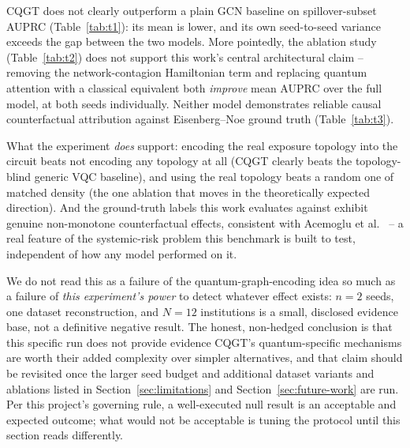 \documentclass[journal]{IEEEtran}
\begin{document}
CQGT does not clearly outperform a plain GCN baseline on spillover-subset
AUPRC (Table~\ref{tab:t1}): its mean is lower, and its own seed-to-seed
variance exceeds the gap between the two models. More pointedly, the
ablation study (Table~\ref{tab:t2}) does not support this work's central
architectural claim -- removing the network-contagion Hamiltonian term
and replacing quantum attention with a classical equivalent both
\emph{improve} mean AUPRC over the full model, at both seeds
individually. Neither model demonstrates reliable causal counterfactual
attribution against Eisenberg--Noe ground truth (Table~\ref{tab:t3}).

What the experiment \emph{does} support: encoding the real exposure
topology into the circuit beats not encoding any topology at all (CQGT
clearly beats the topology-blind generic VQC baseline), and using the
real topology beats a random one of matched density (the one ablation
that moves in the theoretically expected direction). And the ground-truth
labels this work evaluates against exhibit genuine non-monotone
counterfactual effects, consistent with Acemoglu et al.\
\cite{acemoglu2015} -- a real feature of the systemic-risk problem this
benchmark is built to test, independent of how any model performed on
it.

We do not read this as a failure of the quantum-graph-encoding idea so
much as a failure of \emph{this experiment's power} to detect whatever
effect exists: $n=2$ seeds, one dataset reconstruction, and $N=12$
institutions is a small, disclosed evidence base, not a definitive
negative result. The honest, non-hedged conclusion is that this specific
run does not provide evidence CQGT's quantum-specific mechanisms are
worth their added complexity over simpler alternatives, and that claim
should be revisited once the larger seed budget and additional dataset
variants and ablations listed in Section~\ref{sec:limitations} and
Section~\ref{sec:future-work} are run. Per this project's governing rule,
a well-executed null result is an acceptable and expected outcome; what
would not be acceptable is tuning the protocol until this section reads
differently.



\end{document}
